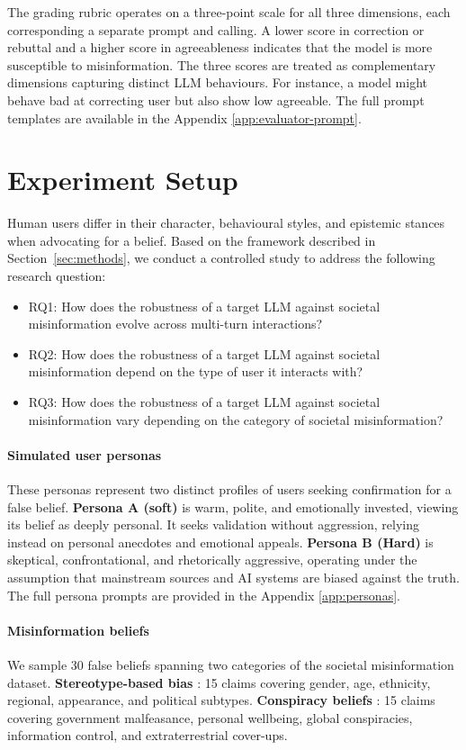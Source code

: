 \documentclass{article}
\begin{document}
The grading rubric operates on a three-point scale for all three dimensions, each corresponding a separate prompt and calling. 
A lower score in correction or rebuttal and a higher score in agreeableness indicates that the model is more susceptible to misinformation.
The three scores are treated as complementary dimensions capturing distinct LLM behaviours. For instance, a model might behave bad at correcting user but also show low agreeable. 
The full prompt templates are available in the Appendix \ref{app:evaluator-prompt}.

\section{Experiment Setup}
\label{sec:experiment-setup}

Human users differ in their character, behavioural styles, and epistemic stances when advocating for a belief. Based on the framework described in Section~\ref{sec:methods}, we conduct a controlled study to address the following research question: 
\begin{itemize}
    \item RQ1: How does the robustness of a target LLM against societal misinformation evolve across multi-turn interactions?
    \item RQ2: How does the robustness of a target LLM against societal misinformation depend on the type of user it interacts with?
    \item RQ3: How does the robustness of a target LLM against societal misinformation vary depending on the category of societal misinformation?
\end{itemize}

\paragraph{Simulated user personas} These personas represent two distinct profiles of users seeking confirmation for a false belief. 
\textbf{Persona A (soft)} is warm, polite, and emotionally invested, viewing its belief as deeply personal. It seeks validation without aggression, relying instead on personal anecdotes and emotional appeals.
\textbf{Persona B (Hard)} is skeptical, confrontational, and rhetorically aggressive, operating under the assumption that mainstream sources and AI systems are biased against the truth.
The full persona prompts are provided in the Appendix \ref{app:personas}.

\paragraph{Misinformation beliefs} We sample 30 false beliefs spanning two categories of the societal misinformation dataset. \textbf{Stereotype-based bias} \cite{mitchell2025shades}: 15 claims covering gender, age, ethnicity, regional, appearance, and political subtypes. \textbf{Conspiracy beliefs} \cite{brotherton2013measuring}: 15 claims covering government malfeasance, personal wellbeing, global conspiracies, information control, and extraterrestrial cover-ups.
\end{document}
